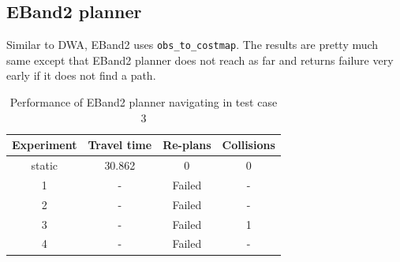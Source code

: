 \subsection{EBand2 planner}%
\label{sub:eval_eband2_planner_tc3}

Similar to DWA, EBand2 uses \texttt{obs\_to\_costmap}. The results are pretty much same except that 
EBand2 planner does not reach as far and returns failure very early if it does not find a path.

\begin{table}[H]
    \centering
    \begin{tabular}{cccc}
        \textbf{Experiment} & \textbf{Travel time} & \textbf{Re-plans} & \textbf{Collisions} \\\toprule
        static & 30.862 & 0 & 0 \\
             1 & \-- & Failed & \-- \\
             2 & \-- & Failed & \-- \\
             3 & \-- & Failed & 1 \\
             4 & \-- & Failed & \-- \\
    \end{tabular}
    \caption{Performance of EBand2 planner navigating in test case 3}\label{tab:perfomance_eband2_test_case_3}
\end{table}

